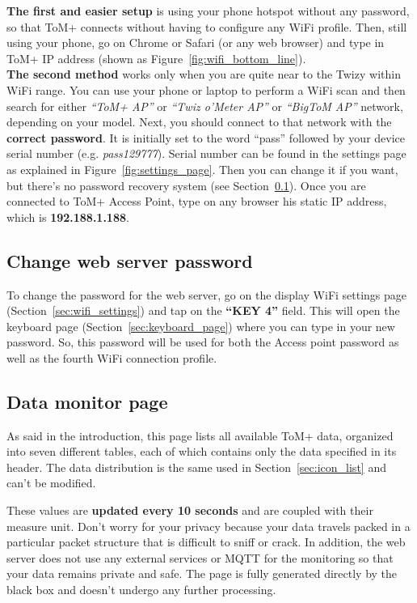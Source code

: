 \textbf{The first and easier setup} is using your phone hotspot without any password, so that ToM+ connects
without having to configure any WiFi profile. Then, still using your phone, go on Chrome or
Safari (or any web browser) and type in ToM+ IP address (shown as Figure~\ref{fig:wifi_bottom_line}).\\

\textbf{The second method} works only when you are quite near to the Twizy within WiFi range.
You can use your phone or laptop to perform a WiFi scan and then search for either
\textit{“ToM+ AP”} or \textit{“Twiz o'Meter AP”} or \textit{“BigToM AP”} network, depending on your model. 
Next, you should connect to that network with the \textbf{correct password}. It is initially 
set to the word “pass” followed by your device serial number (e.g. \textit{pass129777}).
Serial number can be found in the settings page as explained in Figure~\ref{fig:settings_page}. 
Then you can change it if you want, but there's no password recovery system (see Section~\ref{sec:web_change_password}).
Once you are connected to ToM+ Access Point, type on any browser his static IP address, which is \textbf{192.188.1.188}.


\subsection{Change web server password}
\label{sec:web_change_password}

To change the password for the web server, go on the display WiFi settings page (Section~\ref{sec:wifi_settings})
and tap on the \textbf{“KEY 4”} field. This will open the keyboard page (Section~\ref{sec:keyboard_page}) where you can type in your new password.
So, this password will be used for both the Access point password as well as the fourth WiFi connection profile.


\subsection{Data monitor page}
\label{sec:web_data_monitor}

As said in the introduction, this page lists all available ToM+ data, organized into seven
different tables, each of which contains only the data specified in its header. The data
distribution is the same used in Section~\ref{sec:icon_list} and can't be modified.

These values are \textbf{updated every 10 seconds} and are coupled with their measure unit. Don't worry
for your privacy because your data travels packed in a particular packet structure that
is difficult to sniff or crack. In addition, the web server does not use any external
services or MQTT for the monitoring so that your data remains private and safe. The page is fully
generated directly by the black box and doesn't undergo any further processing.


